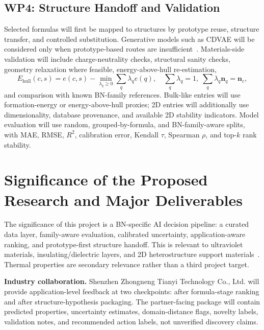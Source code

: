 \documentclass[10pt,a4paper]{article}
\newcommand{\ehull}{E_{\mathrm{hull}}}
\begin{document}
\subsection{WP4: Structure Handoff and Validation}
Selected formulas will first be mapped to structures by prototype reuse, structure transfer, and controlled substitution. Generative models such as CDVAE will be considered only when prototype-based routes are insufficient~\cite{xie2022_cdvae}. Materials-side validation will include charge-neutrality checks, structural sanity checks, geometry relaxation where feasible, energy-above-hull re-estimation,
\[
  \ehull(c,s)=e(c,s)-
  \min_{\lambda_q\ge0}\sum_q\lambda_q e(q),
  \quad \sum_q\lambda_q=1,\;\sum_q\lambda_q\mathbf{n}_q=\mathbf{n}_c,
\]
and comparison with known BN-family references. Bulk-like entries will use formation-energy or energy-above-hull proxies; 2D entries will additionally use dimensionality, database provenance, and available 2D stability indicators. Model evaluation will use random, grouped-by-formula, and BN-family-aware splits, with MAE, RMSE, $R^2$, calibration error, Kendall $\tau$, Spearman $\rho$, and top-$k$ rank stability.

\section{Significance of the Proposed Research and Major Deliverables}
The significance of this project is a BN-specific AI decision pipeline: a curated data layer, family-aware evaluation, calibrated uncertainty, application-aware ranking, and prototype-first structure handoff. This is relevant to ultraviolet materials, insulating/dielectric layers, and 2D heterostructure support materials~\cite{watanabe2004_hbn_uv,cassabois2016_hbn_indirect,dean2010_hbn_graphene}. Thermal properties are secondary relevance rather than a third project target.

\textbf{Industry collaboration.}
Shenzhen Zhongneng Tianyi Technology Co., Ltd. will provide application-level feedback at two checkpoints: after formula-stage ranking and after structure-hypothesis packaging. The partner-facing package will contain predicted properties, uncertainty estimates, domain-distance flags, novelty labels, validation notes, and recommended action labels, not unverified discovery claims.
\end{document}
